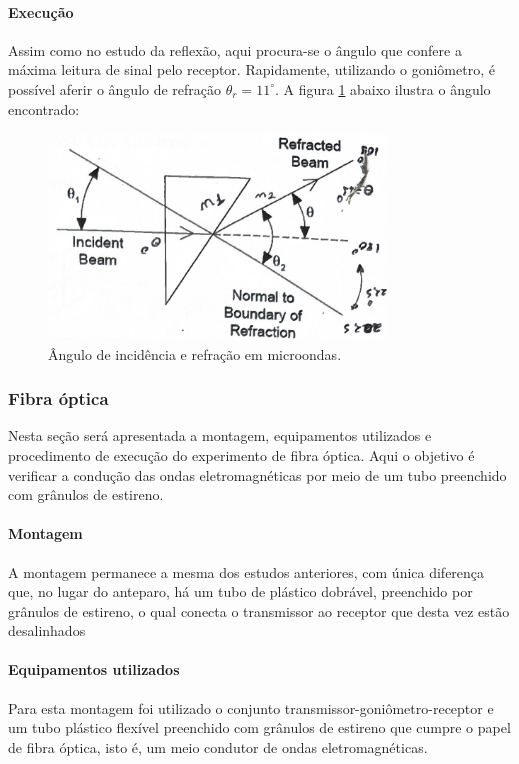 \documentclass[12pt]{article}
\begin{document}
\paragraph{Execução}
Assim como no estudo da reflexão, aqui procura-se o ângulo que
confere a máxima leitura de sinal pelo receptor. Rapidamente,
utilizando o goniômetro, é possível aferir o ângulo de refração
$\theta_r = 11^\circ$. A figura \ref{fig:img/refracaografico.png}
abaixo ilustra o ângulo encontrado:

\begin{figure}[H]
  \centering
  \includegraphics[width=0.8\textwidth]{img/refracaografico.png}
  \caption{Ângulo de incidência e refração em microondas.}
  \label{fig:img/refracaografico.png}
\end{figure}

\subsubsection{Fibra óptica}
Nesta seção será apresentada a montagem, equipamentos utilizados e
procedimento de execução do experimento de fibra óptica. Aqui o
objetivo é verificar a condução das ondas eletromagnéticas por meio
de um tubo preenchido com grânulos de estireno.

\paragraph{Montagem}
A montagem permanece a mesma dos estudos anteriores, com única
diferença que, no lugar do anteparo, há um tubo de plástico dobrável,
preenchido por grânulos de estireno, o qual conecta o transmissor ao
receptor que desta vez estão desalinhados

\paragraph{Equipamentos utilizados}
Para esta montagem foi utilizado o conjunto
transmissor-goniômetro-receptor e um tubo plástico flexível
preenchido com grânulos de estireno que cumpre o papel de fibra
óptica, isto é, um meio condutor de ondas eletromagnéticas.
\end{document}
